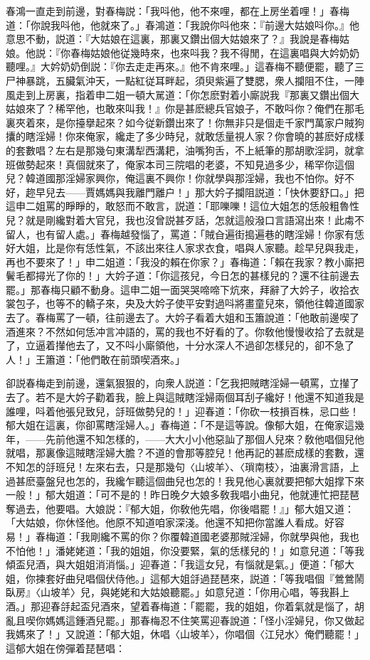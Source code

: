 春鴻一直走到前邊，對春梅説：「我呌他，他不來哩，都在上房坐着哩！」春梅道：「你說我呌他，他就來了。」春鴻道：「我說你呌他來：『前邊大姑娘呌你。』他意思不動，説道：『大姑娘在這裏，那裏又鑽出個大姑娘來了？』我說是春梅姑娘。他説：『你春梅姑娘他従幾時來，也來呌我？我不得閒，在這裏唱與大妗奶奶聽哩。』大妗奶奶倒説：『你去走走再來。』他不肯來哩。」這春梅不聽便罷，聽了三尸神暴跳，五臟氣沖天，一點紅従耳畔起，須臾紫遍了雙腮，衆人攔阻不住，一陣風走到上房裏，指着申二姐一頓大駡道：「你怎麽對着小廝説我『那裏又鑽出個大姑娘來了？稀罕他，也敢來叫我！』你是甚麽總兵官娘子，不敢呌你？俺們在那毛裏夾着來，是你擡擧起來？如今従新鑽出來了！你無非只是個走千家門萬家户賊狗攮的瞎淫婦！你來俺家，纔走了多少時兒，就敢恁量視人家？你會曉的甚麽好成樣的套數唱？左右是那幾句東溝犁西溝耙，油嘴狗舌，不上紙筆的那胡歌淫詞，就拿班做勢起來！真個就來了，俺家本司三院唱的老婆，不知見過多少，稀罕你這個兒？韓道國那淫婦家興你，俺這裏不興你！你就學與那淫婦，我也不怕你。好不好，趂早兒去——賈媽媽與我離門離户！」那大妗子攔阻説道：「快休要舒口。」把這申二姐罵的睜睜的，敢怒而不敢言，説道：「耶嚛嚛！這位大姐怎的恁般粗魯性兒？就是剛纔對着大官兒，我也沒曾説甚歹話，怎就這般潑口言語瀉出來！此䖏不留人，也有留人處。」春梅越發惱了，罵道：「賊㒲遍街搗遍巷的瞎淫婦！你家有恁好大姐，比是你有恁性氣，不該出來往人家求衣食，唱與人家聽。趁早兒與我走，再也不要來了！」申二姐道：「我没的賴在你家？」春梅道：「賴在我家？教小廝把鬢毛都撏光了你的！」大妗子道：「你這孩兒，今日怎的甚樣兒的？還不往前邊去罷。」那春梅只顧不動身。這申二姐一面哭哭啼啼下炕來，拜辭了大妗子，收拾衣裳包子，也等不的轎子來，央及大妗子使平安對過呌將畫童兒來，領他往韓道國家去了。春梅罵了一頓，往前邊去了。大妗子看着大姐和玉簫說道：「他敢前邊喫了酒進來？不然如何恁冲言冲語的，罵的我也不好看的了。你敎他慢慢收拾了去就是了，立逼着攆他去了，又不呌小廝領他，十分水深人不過卻怎樣兒的，卻不急了人！」王簫道：「他們敢在前頭喫酒來。」

卻説春梅走到前邊，還氣狠狠的，向衆人説道：「乞我把賊瞎淫婦一頓罵，立攆了去了。若不是大妗子勸着我，臉上與這賊瞎淫婦兩個耳刮子纔好！他還不知道我是誰哩，呌着他張兒致兒，㧱班做勢兒的！」迎春道：「你砍一枝損百株，忌口些！郁大姐在這裏，你卻罵瞎淫婦人。」春梅道：「不是這等說。像郁大姐，在俺家這幾年，——先前他還不知怎樣的，——大大小小他惡訕了那個人兒來？敎他唱個兒他就唱，那裏像這賊瞎淫婦大膽？不道的會那等腔兒！他再記的甚麽成樣的套數，還不知怎的㧱班兒！左來右去，只是那幾句〈山坡羊〉、〈瑣南枝〉，油裏滑言語，上過甚麽臺盤兒也怎的，我纔乍聽這個曲兒也怎的！我見他心裏就要把郁大姐撑下來一般！」郁大姐道：「可不是的！昨日晚夕大娘多敎我唱小曲兒，他就連忙把琵琶奪過去，他要唱。大娘説：『郁大姐，你敎他先唱，你後唱罷！』」郁大姐又道：「大姑娘，你休怪他。他原不知道咱家深淺。他還不知把你當誰人看成。好容易！」春梅道：「我剛纔不罵的你？你覆韓道國老婆那賊淫婦，你就學與他，我也不怕他！」潘姥姥道：「我的姐姐，你没要緊，氣的恁樣兒的！」如意兒道：「等我傾盃兒酒，與大姐姐消消惱。」迎春道：「我這女兒，有惱就是氣。」便道：「郁大姐，你揀套好曲兒唱個伏侍他。」這郁大姐㧱過琵琶來，説道：「等我唱個『鶯鶯鬧臥房』〈山坡羊〉兒，與姥姥和大姑娘聽罷。」如意兒道：「你用心唱，等我斟上酒。」那迎春㧱起盃兒酒來，望着春梅道：「罷罷，我的姐姐，你着氣就是惱了，胡亂且喫你媽媽這鍾酒兒罷。」那春梅忍不住笑罵迎春說道：「怪小淫婦兒，你又做起我媽來了！」又說道：「郁大姐，休唱〈山坡羊〉，你唱個〈江兒水〉俺們聽罷！」這郁大姐在傍彈着琵琶唱：

